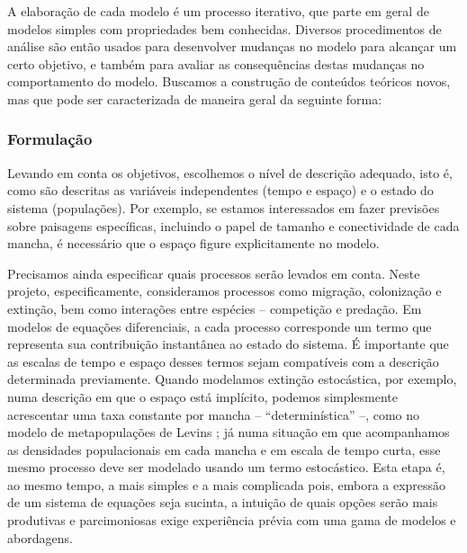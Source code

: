 \documentclass[12pt]{extarticle}
\begin{document}
A elaboração de cada modelo é um processo iterativo, que parte em geral de
modelos simples com propriedades bem conhecidas. Diversos procedimentos de análise são então usados
para desenvolver mudanças no modelo para alcançar um certo objetivo, e também para
avaliar as consequências destas mudanças no comportamento do modelo.
Buscamos a construção de conteúdos teóricos novos, mas que pode ser
caracterizada de maneira geral da seguinte forma:

\renewcommand{\thesubsubsection}{\arabic{subsubsection}} %

\subsubsection{Formulação}

Levando em conta os objetivos, escolhemos o nível de descrição adequado, isto
é, como são descritas as variáveis independentes (tempo e espaço) e o estado
do sistema (populações). Por exemplo, se estamos interessados em fazer
previsões sobre paisagens específicas, incluindo o papel de tamanho e
conectividade de cada mancha, é necessário que o espaço figure explicitamente
no modelo.

Precisamos ainda especificar quais processos serão levados em conta.  Neste
projeto, especificamente, consideramos processos como migração, colonização e
extinção, bem como interações entre espécies -- competição e predação. Em
modelos de equações diferenciais, a cada processo corresponde um termo que
representa sua contribuição instantânea ao estado do sistema. É importante que
as escalas de tempo e espaço desses termos sejam compatíveis com a descrição
determinada previamente. Quando modelamos extinção estocástica, por exemplo,
numa descrição em que o espaço está implícito, podemos simplesmente
acrescentar uma taxa constante por mancha -- ``determinística'' --, como no
modelo de metapopulações de Levins \citep{levins1969}; já numa situação em que
acompanhamos as densidades populacionais em cada mancha e em escala de tempo
curta, esse mesmo processo deve ser modelado usando um termo estocástico.
Esta etapa é, ao mesmo tempo, a mais simples e a mais complicada pois, embora
a expressão de um sistema de equações seja sucinta, a intuição de quais
opções serão mais produtivas e parcimoniosas exige experiência prévia com uma
gama de modelos e abordagens.
\end{document}
